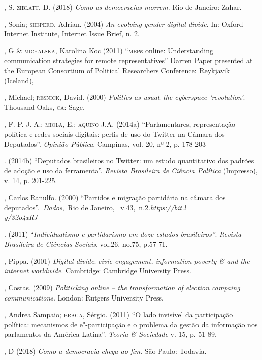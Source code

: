 \begin{bibliohedra}
, S. \textsc{ziblatt}, D. (2018) \emph{Como as democracias morrem}. Rio
de Janeiro: Zahar.

, Sonia; \textsc{sheperd}, Adrian. (2004) \emph{An evolving gender digital
divide}. In: Oxford Internet Institute, Internet Issue Brief, n. 2.

, G \& \textsc{michalska}, Karolina Koc (2011) ``\textsc{mep}s online:
Understanding communication strategies for remote representatives''
Darren Paper presented at the European Consortium of Political
Researchers Conference: Reykjavik (Iceland),

, Michael; \textsc{resnick}, David. (2000) \emph{Politics as usual}:
\emph{the cyberspace `revolution'}. Thousand Oaks, \textsc{ca}: Sage.

, F. P. J. A.; \textsc{miola}, E.; \textsc{aquino} J.A. (2014a) ``Parlamentares,
representação política e redes sociais digitais: perfis de uso do
Twitter na Câmara dos Deputados''. \emph{Opinião Pública}, Campinas,
vol. 20, nº 2, p. 178-203

\titidem. (2014b) ``Deputados
brasileiros no Twitter: um estudo quantitativo dos padrões de adoção e
uso da ferramenta''. \emph{Revista Brasileira de Ciência Política}
(Impresso), v. 14, p. 201-225.

, Carlos Ranulfo. (2000) ``Partidos e migração partidária na câmara
dos deputados''.~\emph{Dados},~Rio de Janeiro,~
v.43,~n.2.\emph{https://bit.l\\y/32o4xRJ}

\titidem. (2011) ``\emph{Individualismo e partidarismo em
doze estados brasileiros''}. \emph{Revista Brasileira de Ciências
Sociais}, vol.26, no.75, p.57-71.

, Pippa. (2001) \emph{Digital divide}: \emph{civic engagement,
information poverty \& and the internet worldwide}. Cambridge: Cambridge
University Press.

, Costas. (2009) \emph{Politicking online -- the
transformation of election campaing communications}. London: Rutgers
University Press.

, Andrea Sampaio; \textsc{braga}, Sérgio. (2011) ``O lado invisível da
participação política: mecanismos de e"-participação e o problema da
gestão da informação nos parlamentos da América Latina''. \emph{Teoria
\& Sociedade} v. 15, p. 51-89.

, D (2018) \emph{Como a democracia chega ao fim}. São Paulo:
Todavia.


\end{bibliohedra}
